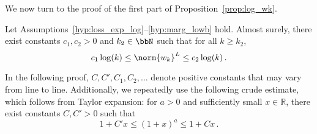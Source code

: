 We now turn to the proof of the first part of Proposition~\ref{prop:log_wk}.
\begin{proposition}
  Let Assumptions~\ref{hyp:loss_exp_log}--\ref{hyp:marg_lowb} hold. Almost surely, there exist constants $c_1,c_2 >0$ and $k_2 \in \bbN$ such that for all $k \geq k_2$, 
  \begin{equation*}
   c_1 \log(k) \leq  \norm{w_k}^L \leq c_2 \log(k)\, .
  \end{equation*}
\end{proposition}
In the following proof, $ C, C', C_1, C_2, \dots $ denote positive constants that may vary from line to line. Additionally, we repeatedly use the following crude estimate, which follows from Taylor expansion: for $a > 0$ and sufficiently small $ x \in \mathbb{R} $, there exist constants $C, C' > 0$ such that  
\begin{equation*}
  1 + C' x \leq (1 + x)^a \leq 1 + Cx \, .
\end{equation*}  
